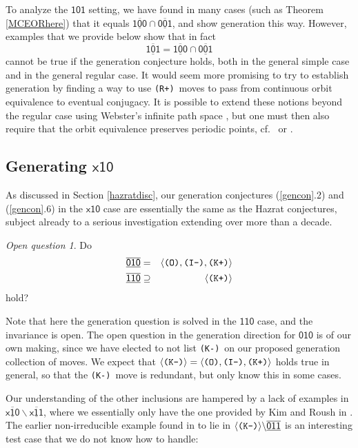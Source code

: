 \documentclass[12pt]{amsbook}%
\theoremstyle{defin}
\theoremstyle{remark}
\newtheorem{openq}[theor]{Open question}
\numberwithin{equation}{chapter}
\numberwithin{theor}{section}
\newcommand{\xyz}[1]{\mbox{$\mathsf{#1}$}}
\newcommand{\xyzrel}[1]{\mbox{$\overline{\underline{\mathsf{ #1}}}$}}
\newcommand{\IIIm}{\mbox{\texttt{\textup{(I-)}}}}
\newcommand{\OOO}{\mbox{\texttt{\textup{(O)}}}}
\newcommand{\RRRp}{\mbox{\texttt{\textup{(R+)}}}}
\newcommand{\KKKp}{\mbox{\texttt{\textup{(K+)}}}}
\newcommand{\KKKm}{\mbox{\texttt{\textup{(K-)}}}}
\begin{document}
To analyze the \xyz{101} setting, we have found in many cases (such as Theorem \ref{MCEORhere}) that it equals $\xyzrel{100}\cap\xyzrel{001}$, and show generation this way. However, examples that we provide below show that in fact
\[
\xyzrel{101}=\xyzrel{100}\cap\xyzrel{001}
\]
cannot be true if the generation conjecture holds, both in the general simple case and in the general regular case. It would seem more promising to try to establish generation by finding a way to use \RRRp\ moves to pass from continuous orbit equivalence to eventual conjugacy. It is possible to extend these notions beyond the regular case using Webster's infinite path space \cite{sbgw:psdg}, but one must then also require that the orbit equivalence preserves periodic points, cf.~\cite{seaseer:dcdpgc} or \cite{tmcmlw:oegigg}.

\subsection{Generating  \xyz{x10}}

As discussed in Section \ref{hazratdisc}, our generation conjectures (\ref{gencon}.2) and (\ref{gencon}.6) in the \xyz{x10} case are essentially the same as the Hazrat conjectures, subject already to a serious investigation extending over more than a decade. 

\begin{openq} Do
\begin{eqnarray*}
\xyzrel{010}&=&\langle \OOO,\IIIm,\KKKp\rangle\\
\xyzrel{110}&\supseteq&\langle \KKKp\rangle\\
\end{eqnarray*}
hold?
\end{openq}

Note that here the generation question is solved in the \xyz{110} case, and the invariance is open. The open question in the generation direction for \xyz{010} is of our own making, since we have elected to not list \KKKm\ on our proposed generation collection of moves. We expect that $\langle \KKKm\rangle=\langle \OOO,\IIIm,\KKKp\rangle$ holds true in general, so that the \KKKm\ move is redundant, but only know this in some cases.

Our understanding of the other inclusions are hampered by a lack of examples in $\xyzrel{x10}\backslash \xyzrel{x11}$, where we essentially only have the one provided by Kim and Roush in \cite{khkfwr:wcfis}. The earlier non-irreducible example 
found in \cite{khkfwr:wcfrs} to lie in $\langle\KKKm\rangle \backslash \xyzrel{011}$ is an interesting test case that we do not know how to handle:
\end{document}
